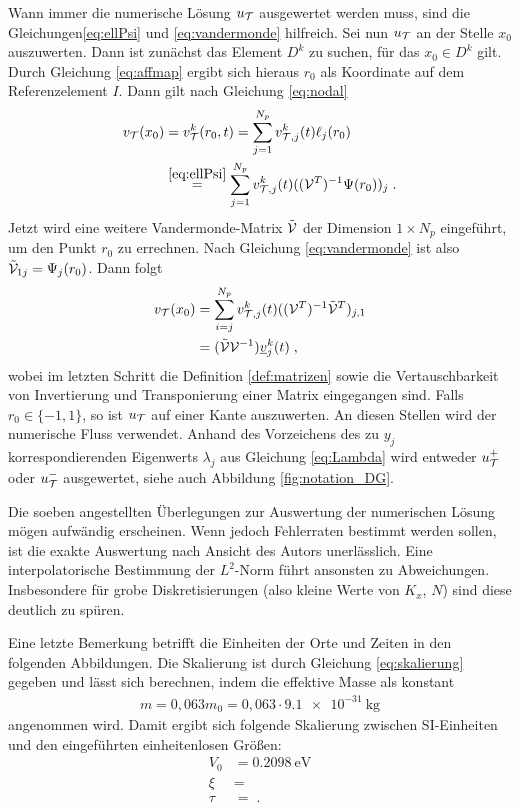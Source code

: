 Wann immer die numerische Lösung $u_{\mathcal{T}}$ ausgewertet werden muss, sind die Gleichungen\eqref{eq:ellPsi} und \eqref{eq:vandermonde} hilfreich. Sei nun $u_{\mathcal{T}}$ an der Stelle $x_0$ auszuwerten. Dann ist zunächst das Element $D^k$ zu suchen, für das $x_0\in D^k$ gilt. Durch Gleichung \eqref{eq:affmap} ergibt sich hieraus $r_0$ als Koordinate auf dem Referenzelement $I$. Dann gilt nach Gleichung \eqref{eq:nodal}
\begin{align*}
  v_{\mathcal{T}}(x_0) &= v_{\mathcal{T}}^k(r_0,t) = \sum_{j=1}^{N_p} v_{\mathcal{T},j}^k(t)\ell_j(r_0) \\
   &\stackrel{\eqref{eq:ellPsi}}{=} \sum_{j=1}^{N_p} v_{\mathcal{T},j}^k(t) ((\mathcal{V}^T)^{-1}\Psi(r_0))_j \; .
\end{align*}
Jetzt wird eine weitere Vandermonde-Matrix $\tilde{\mathcal{V}}$ der Dimension $1\times N_p$ eingeführt, um den Punkt $r_0$ zu errechnen. Nach Gleichung \eqref{eq:vandermonde} ist also $\tilde{\mathcal{V}}_{1j}=\Psi_j(r_0)$. Dann folgt
\begin{align*}
  v_{\mathcal{T}}(x_0) &= \sum_{i=j}^{N_p} v_{\mathcal{T},j}^k(t) ((\mathcal{V}^T)^{-1}\tilde{\mathcal{V}}^T)_{j,1} \\
  &= (\tilde{\mathcal{V}}\mathcal{V}^{-1})\underline{v}_j^k(t) \; ,
\end{align*}
wobei im letzten Schritt die Definition \ref{def:matrizen} sowie die Vertauschbarkeit von Invertierung und Transponierung einer Matrix eingegangen sind. Falls $r_0\in\{-1,1\}$, so ist $u_{\mathcal{T}}$ auf einer Kante auszuwerten. An diesen Stellen wird der numerische Fluss verwendet. Anhand des Vorzeichens des zu $y_j$ korrespondierenden Eigenwerts $\lambda_j$ aus Gleichung \eqref{eq:Lambda} wird entweder $u_{\mathcal{T}}^+$ oder $u_{\mathcal{T}}^-$ ausgewertet, siehe auch Abbildung \ref{fig:notation_DG}.

Die soeben angestellten Überlegungen zur Auswertung der numerischen Lösung mögen aufwändig erscheinen. Wenn jedoch Fehlerraten bestimmt werden sollen, ist die exakte Auswertung nach Ansicht des Autors unerlässlich. Eine interpolatorische Bestimmung der $L^2$-Norm führt ansonsten zu Abweichungen. Insbesondere für grobe Diskretisierungen (also kleine Werte von $K_x$, $N$) sind diese deutlich zu spüren.

Eine letzte Bemerkung betrifft die Einheiten der Orte und Zeiten in den folgenden Abbildungen. Die Skalierung ist durch Gleichung \eqref{eq:skalierung} gegeben und lässt sich berechnen, indem die effektive Masse als konstant
\begin{align*}
  m = 0,063 m_0 =  0,063\cdot\SI{9.1e-31}{\kilogram}
\end{align*}
angenommen wird. Damit ergibt sich folgende Skalierung zwischen SI-Einheiten und den eingeführten einheitenlosen Größen:
\begin{equation}
  \begin{aligned}
    V_0 &= \SI{0.2098}{\electronvolt} \\
    \xi &=  \\
    \tau &=  \; .
  \end{aligned}
  \label{eq:skala}
\end{equation}

